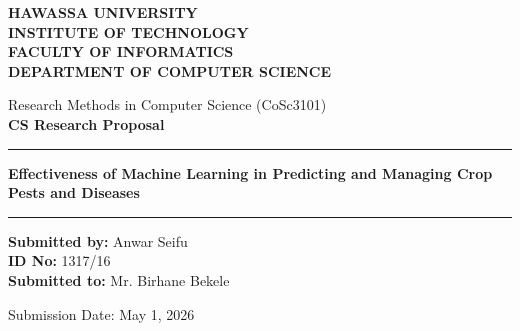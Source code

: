 \documentclass[12pt,a4paper]{article}
\begin{document}
\begin{titlepage}
    \begin{center}
        \vspace*{1cm}
        
        \Large \textbf{HAWASSA UNIVERSITY} \\
        \large \textbf{INSTITUTE OF TECHNOLOGY} \\
        \large \textbf{FACULTY OF INFORMATICS} \\
        \large \textbf{DEPARTMENT OF COMPUTER SCIENCE} \\
        
        \vfill
        
        \large Research Methods in Computer Science (CoSc3101) \\
        \vspace{0.5cm}
        \Large \textbf{CS Research Proposal} \\
        
        \vspace{1.5cm}
        
      
        
        \hrule
        \vspace{0.4cm}
        \huge \textbf{Effectiveness of Machine Learning in Predicting and Managing Crop Pests and Diseases} \\
        \vspace{0.4cm}
        \hrule
        
        \vfill
        
        \begin{flushleft}
            \large
            \textbf{Submitted by:} Anwar Seifu \\
            \textbf{ID No:} 1317/16 \\
            \vspace{0.8cm}
            \textbf{Submitted to:} Mr. Birhane Bekele \\
        \end{flushleft}
        
        \vfill
        
        \large Submission Date: May 1, 2026 
          
    \end{center}
\end{titlepage}

\newpage
\tableofcontents
\newpage
\end{document}
